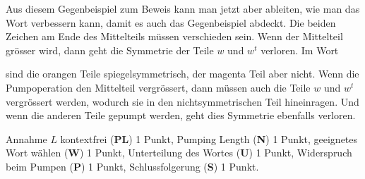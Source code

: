 \begin{loesung}
Aus diesem Gegenbeispiel zum Beweis kann man jetzt aber ableiten, wie
man das Wort verbessern kann, damit es auch das Gegenbeispiel abdeckt.
Die beiden Zeichen am Ende des Mittelteils müssen verschieden sein.
Wenn der Mittelteil grösser wird, dann geht die Symmetrie der Teile
$w$ und $w^t$ verloren.
Im Wort
\begin{center}
\end{center}
sind die orangen Teile spiegelsymmetrisch, der magenta Teil aber nicht.
Wenn die Pumpoperation den Mittelteil vergrössert, dann müssen auch
die Teile $w$ und $w^t$ vergrössert werden, wodurch sie in den
nichtsymmetrischen Teil hineinragen.
Und wenn die anderen Teile gepumpt werden, geht dies Symmetrie ebenfalls
verloren.
\qedhere
\end{loesung}

\begin{bewertung}
Annahme $L$ kontextfrei ({\bf PL}) 1 Punkt,
Pumping Length ({\bf N}) 1 Punkt,
geeignetes Wort wählen ({\bf W}) 1 Punkt,
Unterteilung des Wortes ({\bf U}) 1 Punkt,
Widerspruch beim Pumpen ({\bf P}) 1 Punkt,
Schlussfolgerung ({\bf S}) 1 Punkt.
\end{bewertung}

